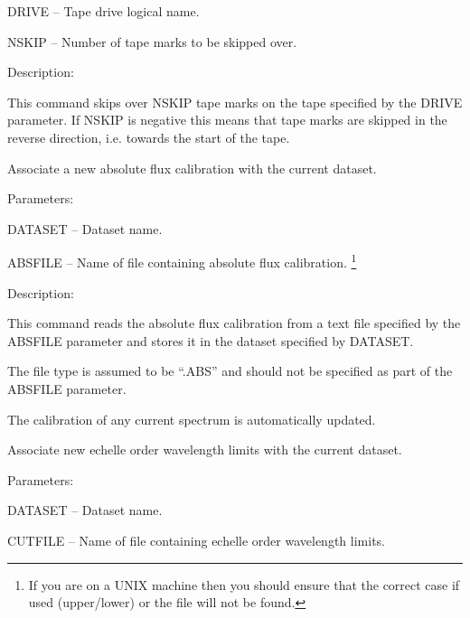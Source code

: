 \begin {description}
\begin {description}
\begin {description}
\item DRIVE -- Tape drive logical name.
\item NSKIP -- Number of tape marks to be skipped over.
\end {description}

\item Description:

This command skips over NSKIP tape marks on the tape specified
by the DRIVE parameter.
If NSKIP is negative this means that tape marks are skipped in the
reverse direction, i.e. towards the start of the tape.
\end {description}

\item [NEWABS]
Associate a new absolute flux calibration with the current dataset.

\begin {description}
\item Parameters:

\begin {description}
\item DATASET -- Dataset name.
\item ABSFILE -- Name of file containing absolute flux calibration.
\footnote{If you are on a UNIX machine then you should ensure that the
correct case if used (upper/lower) or the file will not be found.}
\end {description}

\item Description:

This command reads the absolute flux calibration from a text file
specified by the ABSFILE parameter and stores it in the dataset
specified by DATASET.

The file type is assumed to be ``.ABS'' and should not be
specified as part of the ABSFILE parameter.

The calibration of any current spectrum is automatically updated.
\end {description}

\item [NEWCUT]
Associate new echelle order wavelength limits with the current
dataset.

\begin {description}
\item Parameters:

\begin {description}
\item DATASET -- Dataset name.
\item CUTFILE -- Name of file containing echelle order wavelength limits.
\end {description}


\end{description}
\end{description}
